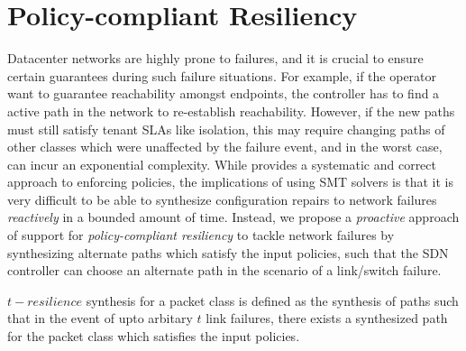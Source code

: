 \section{Policy-compliant Resiliency}
Datacenter networks are highly prone to failures, 
and it is crucial to ensure certain guarantees during such failure
situations. For example, if the operator want to guarantee
reachability amongst endpoints, the controller has to find a active
path in the network to re-establish reachability. However, if the new
paths must still satisfy tenant SLAs like isolation, this may require 
changing paths of other classes which were unaffected by the failure event,
and in the worst case, can incur an exponential complexity.
While \name provides a systematic and correct approach
to enforcing policies, the implications of using SMT solvers is that
it is very difficult to be able to synthesize configuration repairs to
network failures \emph{reactively} in a bounded amount of time. 
Instead, we propose a \emph{proactive} approach 
of support for \emph{policy-compliant resiliency} to tackle network failures
by synthesizing alternate paths which satisfy the input policies, such that the SDN controller 
can choose an alternate path in the scenario of a link/switch failure.

\begin{mydef}
	$t-resilience$ synthesis for a packet class is defined as the
	synthesis of paths such that in the event of upto arbitary
	$t$ link failures, there exists a synthesized path for the packet class which
	satisfies the input policies. 
\end{mydef}
